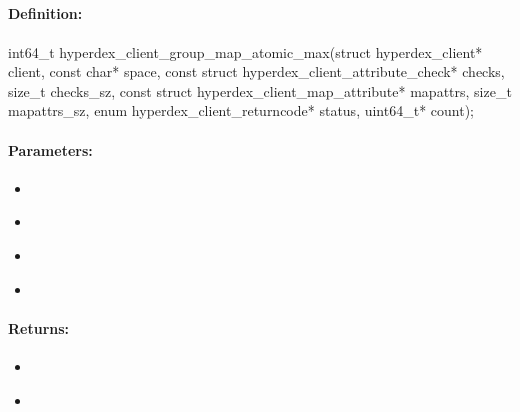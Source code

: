 \pagebreak
\subsection{}
\label{api:c:group_map_atomic_max}


\paragraph{Definition:}
\begin{ccode}
int64_t hyperdex_client_group_map_atomic_max(struct hyperdex_client* client,
        const char* space,
        const struct hyperdex_client_attribute_check* checks, size_t checks_sz,
        const struct hyperdex_client_map_attribute* mapattrs, size_t mapattrs_sz,
        enum hyperdex_client_returncode* status,
        uint64_t* count);
\end{ccode}

\paragraph{Parameters:}
\begin{itemize}[noitemsep]
\item {}\\

\item {}\\

\item {}\\

\item {}\\

\end{itemize}

\paragraph{Returns:}
\begin{itemize}[noitemsep]
\item {}\\

\item {}\\

\end{itemize}

